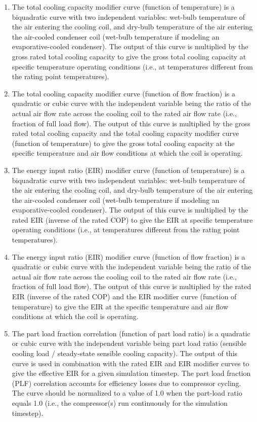 \begin{enumerate}
\def\labelenumi{\arabic{enumi}.}
\item
  The total cooling capacity modifier curve (function of temperature) is a biquadratic curve with two independent variables: wet-bulb temperature of the air entering the cooling coil, and dry-bulb temperature of the air entering the air-cooled condenser coil (wet-bulb temperature if modeling an evaporative-cooled condenser). The output of this curve is multiplied by the gross rated total cooling capacity to give the gross total cooling capacity at specific temperature operating conditions (i.e., at temperatures different from the rating point temperatures).
\item
  The total cooling capacity modifier curve (function of flow fraction) is a quadratic or cubic curve with the independent variable being the ratio of the actual air flow rate across the cooling coil to the rated air flow rate (i.e., fraction of full load flow). The output of this curve is multiplied by the gross rated total cooling capacity and the total cooling capacity modifier curve (function of temperature) to give the gross total cooling capacity at the specific temperature and air flow conditions at which the coil is operating.
\item
  The energy input ratio (EIR) modifier curve (function of temperature) is a biquadratic curve with two independent variables: wet-bulb temperature of the air entering the cooling coil, and dry-bulb temperature of the air entering the air-cooled condenser coil (wet-bulb temperature if modeling an evaporative-cooled condenser). The output of this curve is multiplied by the rated EIR (inverse of the rated COP) to give the EIR at specific temperature operating conditions (i.e., at temperatures different from the rating point temperatures).
\item
  The energy input ratio (EIR) modifier curve (function of flow fraction) is a quadratic or cubic curve with the independent variable being the ratio of the actual air flow rate across the cooling coil to the rated air flow rate (i.e., fraction of full load flow). The output of this curve is multiplied by the rated EIR (inverse of the rated COP) and the EIR modifier curve (function of temperature) to give the EIR at the specific temperature and air flow conditions at which the coil is operating.
\item
  The part load fraction correlation (function of part load ratio) is a quadratic or cubic curve with the independent variable being part load ratio (sensible cooling load / steady-state sensible cooling capacity). The output of this curve is used in combination with the rated EIR and EIR modifier curves to give the effective EIR for a given simulation timestep. The part load fraction (PLF) correlation accounts for efficiency losses due to compressor cycling. The curve should be normalized to a value of 1.0 when the part-load ratio equals 1.0 (i.e., the compressor(s) run continuously for the simulation timestep).
\end{enumerate}

